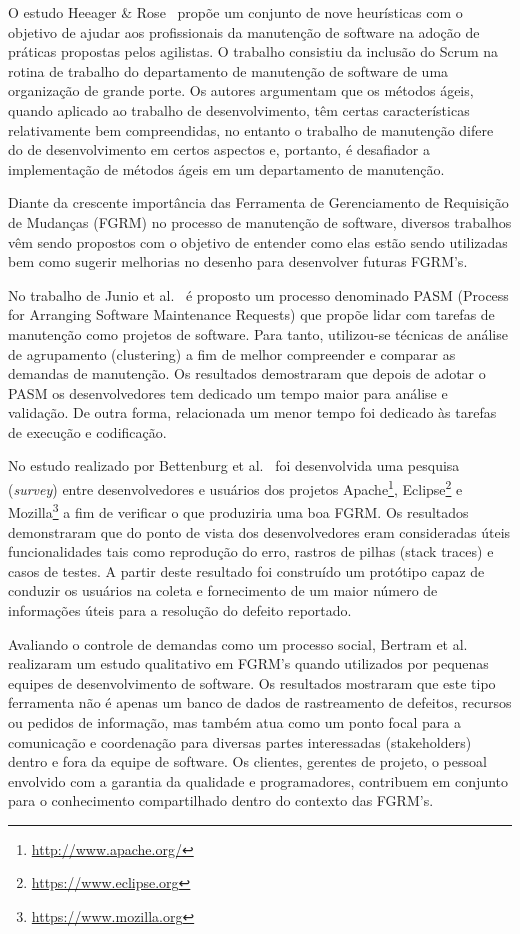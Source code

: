 O estudo Heeager \& Rose~\cite{Heeager2015} propõe um conjunto de nove
heurísticas com o objetivo de ajudar aos profissionais da manutenção de
software na adoção de práticas propostas pelos agilistas. O trabalho consistiu
da inclusão do Scrum na rotina de trabalho do departamento de manutenção de
software de uma organização de grande porte. Os autores argumentam que os
métodos ágeis, quando aplicado ao trabalho de desenvolvimento, têm certas
características relativamente bem compreendidas, no entanto o trabalho de
manutenção difere do de desenvolvimento em certos aspectos e, portanto, é
desafiador a implementação de métodos ágeis em um departamento de manutenção.

Diante da crescente importância das Ferramenta de Gerenciamento de Requisição
de Mudanças (FGRM) no processo de manutenção de software, diversos trabalhos
vêm sendo propostos com o objetivo de entender como elas estão sendo utilizadas
bem como sugerir melhorias no desenho para desenvolver futuras FGRM's.

No trabalho de Junio et al.~\cite{5741246} é proposto um processo denominado
PASM (Process for Arranging Software Maintenance Requests) que propõe lidar com
tarefas de manutenção como projetos de software. Para tanto, utilizou-se
técnicas de análise de agrupamento (clustering) a fim de melhor compreender e
comparar as demandas de manutenção. Os resultados demostraram que depois de
adotar o PASM os desenvolvedores tem dedicado um tempo maior para análise e
validação. De outra forma, relacionada um menor tempo foi dedicado às tarefas
de execução e codificação.

No estudo realizado por Bettenburg et al.~\cite{bettenburg2008makes} foi
desenvolvida uma pesquisa (\textit{survey}) entre desenvolvedores e usuários
dos projetos Apache\footnote{\url{http://www.apache.org/}},
Eclipse\footnote{\url{https://www.eclipse.org}} e
Mozilla\footnote{\url{https://www.mozilla.org}} a fim de verificar o que
produziria uma boa FGRM\@. Os resultados demonstraram que do ponto de vista dos
desenvolvedores eram consideradas úteis funcionalidades tais como reprodução do
erro, rastros de pilhas (stack traces) e casos de testes. A partir deste
resultado foi construído um protótipo capaz de conduzir os usuários na coleta e
fornecimento de um maior número de informações úteis para a resolução do
defeito reportado.

Avaliando o controle de demandas como um processo social, Bertram et
al.~\cite{Bertram:2010:CCB:1718918.1718972} realizaram um estudo qualitativo em
FGRM's quando utilizados por pequenas equipes de desenvolvimento de software.
Os resultados mostraram que este tipo ferramenta não é apenas um banco de dados
de rastreamento de defeitos, recursos ou pedidos de informação, mas também atua
como um ponto focal para a comunicação e coordenação para diversas partes
interessadas (stakeholders) dentro e fora da equipe de software. Os clientes,
gerentes de projeto, o pessoal envolvido com a garantia da qualidade e
programadores, contribuem em conjunto para o conhecimento compartilhado dentro
do contexto das FGRM's.


